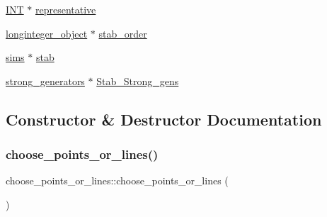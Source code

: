\begin{DoxyCompactItemize}
\item 
\mbox{\hyperlink{galois_8h_a09fddde158a3a20bd2dcadb609de11dc}{I\+NT}} $\ast$ \mbox{\hyperlink{classchoose__points__or__lines_ac9795566e25cb51fc70dbfe6c7383844}{representative}}
\item 
\mbox{\hyperlink{classlonginteger__object}{longinteger\+\_\+object}} $\ast$ \mbox{\hyperlink{classchoose__points__or__lines_a61b0cd34f02db734a2f5c5f71bba61da}{stab\+\_\+order}}
\item 
\mbox{\hyperlink{classsims}{sims}} $\ast$ \mbox{\hyperlink{classchoose__points__or__lines_af0ba31974f849fde542e5b67c6b23ad4}{stab}}
\item 
\mbox{\hyperlink{classstrong__generators}{strong\+\_\+generators}} $\ast$ \mbox{\hyperlink{classchoose__points__or__lines_ae77d5650c16e5fa93b97d335ca2f8255}{Stab\+\_\+\+Strong\+\_\+gens}}
\end{DoxyCompactItemize}


\subsection{Constructor \& Destructor Documentation}
\mbox{\label{classchoose__points__or__lines_a828a78cf68517b36fb8217933d6d8d0c}} 
\subsubsection{\texorpdfstring{choose\+\_\+points\+\_\+or\+\_\+lines()}{choose\_points\_or\_lines()}}
{\footnotesize\ttfamily choose\+\_\+points\+\_\+or\+\_\+lines\+::choose\+\_\+points\+\_\+or\+\_\+lines (\begin{DoxyParamCaption}{ }\end{DoxyParamCaption})}

\mbox{\label{classchoose__points__or__lines_a4065c741379ae9de19c1fb9c593a0404}} 
